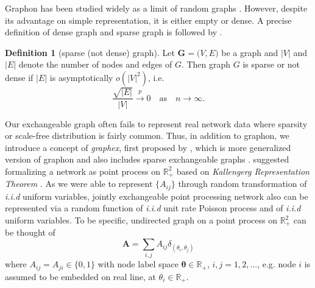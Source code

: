 \documentclass[12pt]{article}
\theoremstyle{definition}
\newtheorem{definition}{Definition}[section]
\begin{document}
Graphon has been studied widely as a limit of random graphs \citep{lovasz2006limits}. However, despite its advantage on simple representation, it is either empty or dense. A precise definition of dense graph and sparse graph is followed by \cite{veitch2015class}. 
\begin{definition}[sparse (not dense) graph]
Let $\mathbf{G} = \big(  V, E \big)$ be a graph and $|V|$ and $|E|$ denote the number of nodes and edges of $G$. Then graph $G$ is sparse or not dense if $|E|$ is asymptotically $o(|V|^2)$, i.e.
\begin{equation}
\frac{\sqrt{|E|}}{|V|} \xrightarrow{p} 0 \quad \mbox{as} \quad n \rightarrow \infty.
\end{equation}
\end{definition}
Our exchangeable graph often fails to represent real network data where sparsity or scale-free distribution is fairly common. Thus, in addition to graphon, we introduce a concept of \textit{graphex}, first proposed by \cite{veitch2015class}, which is more generalized version of graphon and also includes sparse exchangeable graphs \citep{caron2014sparse}.  \cite{caron2014sparse} suggested formalizing a network as point process on $\mathbb{R}^2_{+}$ based on \textit{Kallengerg Representation Theorem} \citep{kallenberg1990exchangeable}. As we were able to represent $\{ A_{ij} \}$ through random transformation of \textit{i.i.d} uniform variables, jointly exchangeable point processing network also can be represented via a random function of \textit{i.i.d} unit rate Poisson process and of \textit{i.i.d} uniform variables. 
To be specific, undirected graph on a point process on $\mathbb{R}^2_{+}$ can be thought of 
\begin{equation}
\mathbf{A} = \sum\limits_{i,j} A_{ij} \delta_{( \theta_{i}, \theta_{j})} 
\end{equation}	
where $A_{ij} = A_{ji} \in \{ 0 , 1  \}$ with node label space $\mathbf{\theta} \in \mathbb{R}_{+}$, $i,j = 1,2,...$, e.g.  node $i$ is assumed to be embedded on real line, at $\theta_{i} \in \mathbb{R}_{+}$. 	
				
\end{document}
